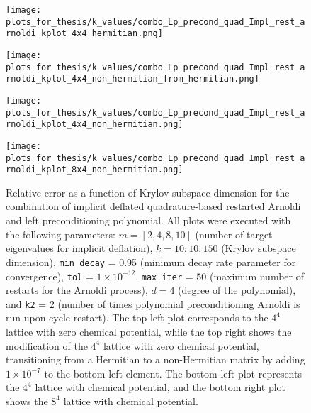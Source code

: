 \begin{figure}[H]
    \centering
    \begin{minipage}{0.45\textwidth}
        \centering
        \texttt{[image: plots\_for\_thesis/k\_values/combo\_Lp\_precond\_quad\_Impl\_rest\_arnoldi\_kplot\_4x4\_hermitian.png]} %
    \end{minipage}%
    \hspace{0.02\textwidth} %
    \begin{minipage}{0.45\textwidth}
        \centering
        \texttt{[image: plots\_for\_thesis/k\_values/combo\_Lp\_precond\_quad\_Impl\_rest\_arnoldi\_kplot\_4x4\_non\_hermitian\_from\_hermitian.png]} %
    \end{minipage}
    
    \vspace{0.02\textwidth} %
    
    \begin{minipage}{0.45\textwidth}
        \centering
        \texttt{[image: plots\_for\_thesis/k\_values/combo\_Lp\_precond\_quad\_Impl\_rest\_arnoldi\_kplot\_4x4\_non\_hermitian.png]} %
    \end{minipage}%
    \hspace{0.02\textwidth} %
    \begin{minipage}{0.45\textwidth}
        \centering
        \texttt{[image: plots\_for\_thesis/k\_values/combo\_Lp\_precond\_quad\_Impl\_rest\_arnoldi\_kplot\_8x4\_non\_hermitian.png]} %
    \end{minipage}
    
    \caption{\small Relative error as a function of Krylov subspace dimension for the combination of implicit deflated quadrature-based restarted Arnoldi and left preconditioning polynomial. All plots were executed with the following parameters: $m = [2, 4, 8, 10]$ (number of target eigenvalues for implicit deflation), $k = 10:10:150$ (Krylov subspace dimension), \texttt{min\_decay} = 0.95 (minimum decay rate parameter for convergence), \texttt{tol} = $1 \times 10^{-12}$, \texttt{max\_iter} = 50 (maximum number of restarts for the Arnoldi process), $d = 4$ (degree of the polynomial), and \texttt{k2} = 2 (number of times polynomial preconditioning Arnoldi is run upon cycle restart). The top left plot corresponds to the $4^4$ lattice with zero chemical potential, while the top right shows the modification of the $4^4$ lattice with zero chemical potential, transitioning from a Hermitian to a non-Hermitian matrix by adding $1 \times 10^{-7}$ to the bottom left element. The bottom left plot represents the $4^4$ lattice with chemical potential, and the bottom right plot shows the $8^4$ lattice with chemical potential.}
    \label{fig:combo_imp_rest_arnoldi+left_precond_k_plot}
\end{figure}

